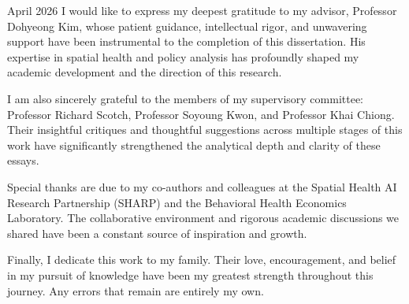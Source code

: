 \begin{acks}{April 2026}
I would like to express my deepest gratitude to my advisor, Professor Dohyeong Kim, whose patient guidance, intellectual rigor, and unwavering support have been instrumental to the completion of this dissertation. His expertise in spatial health and policy analysis has profoundly shaped my academic development and the direction of this research.

I am also sincerely grateful to the members of my supervisory committee: Professor Richard Scotch, Professor Soyoung Kwon, and Professor Khai Chiong. Their insightful critiques and thoughtful suggestions across multiple stages of this work have significantly strengthened the analytical depth and clarity of these essays.

Special thanks are due to my co-authors and colleagues at the Spatial Health AI Research Partnership (SHARP) and the Behavioral Health Economics Laboratory. The collaborative environment and rigorous academic discussions we shared have been a constant source of inspiration and growth.

Finally, I dedicate this work to my family. Their love, encouragement, and belief in my pursuit of knowledge have been my greatest strength throughout this journey. Any errors that remain are entirely my own.
\end{acks}
